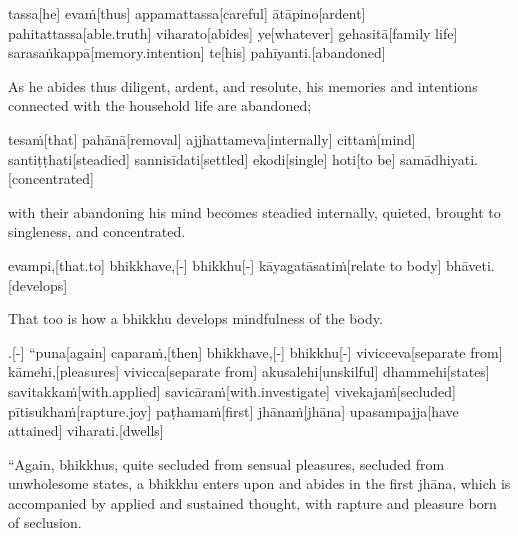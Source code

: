 \begin{samepage}
\begingl[glneveryline={\PaliGlossA,\PaliGlossB}]
tassa[he] evaṁ[thus] appamattassa[careful] ātāpino[ardent] pahitattassa[able.truth] viharato[abides] ye[whatever] gehasitā[family life] sarasaṅkappā[memory.intention] te[his] pahīyanti.[abandoned]
\endgl
\nopagebreak
\linespread{0.5}
\begin{spacin}{0.2}
{\PaliGlossFT As he abides thus diligent, ardent, and resolute, his memories and intentions connected with the household life are abandoned;}
\end{spacin}
\vskip 12pt
\end{samepage}
\begin{samepage}
\begingl[glneveryline={\PaliGlossA,\PaliGlossB}]
tesaṁ[that] pahānā[removal] ajjhattameva[internally] cittaṁ[mind] santiṭṭhati[steadied] sannisīdati[settled] ekodi[single] hoti[to be] samādhiyati.[concentrated]
\endgl
\nopagebreak
\linespread{0.5}
\begin{spacin}{0.2}
{\PaliGlossFT with their abandoning his mind becomes steadied internally, quieted, brought to singleness, and concentrated.}
\end{spacin}
\vskip 12pt
\end{samepage}
\begin{samepage}
\begingl[glneveryline={\PaliGlossA,\PaliGlossB}]
evampi,[that.to] bhikkhave,[-] bhikkhu[-] kāyagatāsatiṁ[relate to body] bhāveti.[develops]
\endgl
\nopagebreak
\linespread{0.5}
\begin{spacin}{0.2}
{\PaliGlossFT That too is how a bhikkhu develops mindfulness of the body.}
\end{spacin}
\vskip 12pt
\end{samepage}
\vskip 0.05in
\begin{samepage}
.[-] “puna[again] caparaṁ,[then] bhikkhave,[-] bhikkhu[-] vivicceva[separate from] kāmehi,[pleasures] vivicca[separate from] akusalehi[unskilful] dhammehi[states] savitakkaṁ[with.applied] savicāraṁ[with.investigate] vivekajaṁ[secluded] pītisukhaṁ[rapture.joy] paṭhamaṁ[first] jhānaṁ[jhāna] upasampajja[have attained] viharati.[dwells]
\endgl
\nopagebreak
\linespread{0.5}
\begin{spacin}{0.2}
{\PaliGlossFT “Again, bhikkhus, quite secluded from sensual pleasures, secluded from unwholesome states, a bhikkhu enters upon and abides in the first jhāna, which is accompanied by applied and sustained thought, with rapture and pleasure born of seclusion.}
\end{spacin}
\vskip 12pt
\end{samepage}
